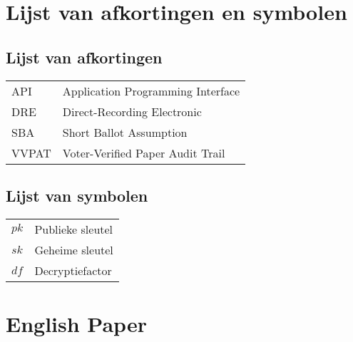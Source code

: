 \documentclass[master=elt,masteroption=im,inputenc=utf8]{kulemt/kulemt}
\begin{document}
  
  

  \begin{preface}
    
  \end{preface}

  \kulemtmanToC
  \tableofcontents

  \begin{abstract}
    
  \end{abstract}
  
  \listoffiguresandtables
  
  \chapter{Lijst van afkortingen en symbolen}
  \section*{Lijst van afkortingen}
  \begin{flushleft}
    \renewcommand{\arraystretch}{1.1}
    \begin{tabularx}{\textwidth}{@{}p{14mm}X@{}}
      API & Application Programming Interface \\
      DRE & Direct-Recording Electronic \\
      SBA & Short Ballot Assumption \\
      VVPAT & Voter-Verified Paper Audit Trail
    \end{tabularx}
  \end{flushleft}
  \section*{Lijst van symbolen}
  \begin{flushleft}
    \renewcommand{\arraystretch}{1.1}
    \begin{tabularx}{\textwidth}{@{}p{14mm}X@{}}
      $pk$ & Publieke sleutel \\
      $sk$ & Geheime sleutel \\
      $df$ & Decryptiefactor
    \end{tabularx}
  \end{flushleft}

  \mainmatter

  
  
  
  
  
  
  
  
  
  

  \appendix
  
  \chapter{English Paper}
  

  \backmatter

  \nocite{*}

  
  
\end{document}
